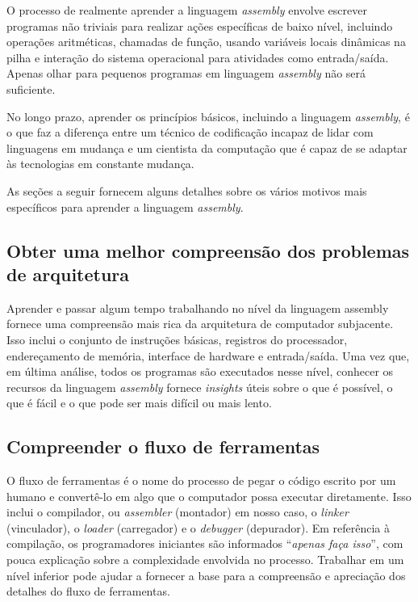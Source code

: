 O processo de realmente aprender a linguagem \textit{assembly} envolve escrever programas não triviais para realizar ações específicas de baixo nível, incluindo operações aritméticas, chamadas de função, usando variáveis locais dinâmicas na pilha e interação do sistema operacional para atividades como entrada/saída. Apenas olhar para pequenos programas em linguagem \textit{assembly} não será suficiente.

No longo prazo, aprender os princípios básicos, incluindo a linguagem \textit{assembly}, é o que faz a diferença entre um técnico de codificação incapaz de lidar com linguagens em mudança e um cientista da computação que é capaz de se adaptar às tecnologias em constante mudança.

As seções a seguir fornecem alguns detalhes sobre os vários motivos mais específicos para aprender a linguagem \textit{assembly}.

\subsection{Obter uma melhor compreensão dos problemas de arquitetura}
Aprender e passar algum tempo trabalhando no nível da linguagem assembly fornece uma compreensão mais rica da arquitetura de computador subjacente. Isso inclui o conjunto de instruções básicas, registros do processador, endereçamento de memória, interface de hardware e entrada/saída. Uma vez que, em última análise, todos os programas são executados nesse nível, conhecer os recursos da linguagem \textit{assembly} fornece \textit{insights} úteis sobre o que é possível, o que é fácil e o que pode ser mais difícil ou mais lento.

\subsection{Compreender o fluxo de ferramentas}
O fluxo de ferramentas é o nome do processo de pegar o código escrito por um humano e convertê-lo em algo que o computador possa executar diretamente. Isso inclui o compilador, ou \textit{assembler} (montador) em nosso caso, o \textit{linker} (vinculador), o \textit{loader} (carregador) e o \textit{debugger} (depurador). Em referência à compilação, os programadores iniciantes são informados ``\textit{apenas faça isso}'', com pouca explicação sobre a complexidade envolvida no processo. Trabalhar em um nível inferior pode ajudar a fornecer a base para a compreensão e apreciação dos detalhes do fluxo de ferramentas.

